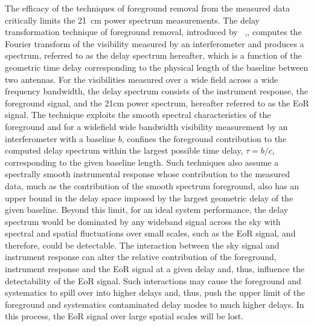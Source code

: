 \documentclass[twocolumn]{emulateapj}
\begin{document}
The efficacy of the techniques of foreground removal from the measured data
critically limits the 21~cm power spectrum measurements. The delay
transformation technique of foreground removal, introduced by
~\citep{Parsons_Backer_2009},\citep{Parsons_et_al_2012}, computes the Fourier
transform of the visibility measured by an interferometer and produces a
spectrum, referred to as the delay spectrum hereafter, which is a function of
the geometric time delay corresponding to the physical length of the baseline
between two antennas. For the visibilities measured over a wide field across a
wide frequency bandwidth, the delay spectrum consists of the instrument
response, the foreground signal, and the 21cm power spectrum, hereafter
referred to as the EoR signal.
The technique exploits the smooth spectral characteristics of the foreground
and for a widefield wide bandwidth visibility measurement by an interferometer
with a baseline $b$, confines the foreground contribution to the computed delay
spectrum within the largest possible time delay, $\tau = b/c$, corresponding to
the given baseline length. Such techniques also assume a spectrally smooth
instrumental response whose contribution to the measured data, much as the
contribution of the smooth spectrum foreground, also has an upper bound in the
delay space imposed by the largest geometric delay of the given baseline.
Beyond this limit, for an ideal system performance, the delay spectrum would be
dominated by any wideband signal across the sky with spectral and spatial
fluctuations over small scales, such as the EoR signal, and therefore, could be
detectable. The interaction between the sky signal and instrument response can
alter the relative contribution of the foreground, instrument response and the
EoR signal at a given delay and, thus, influence the detectability of the EoR
signal. Such interactions may cause the foreground and systematics to spill
over into higher delays and, thus, push the upper limit of the foreground and
systematics contaminated delay modes to much higher delays. In this process,
the EoR signal over large spatial scales will be lost. \\
\end{document}
